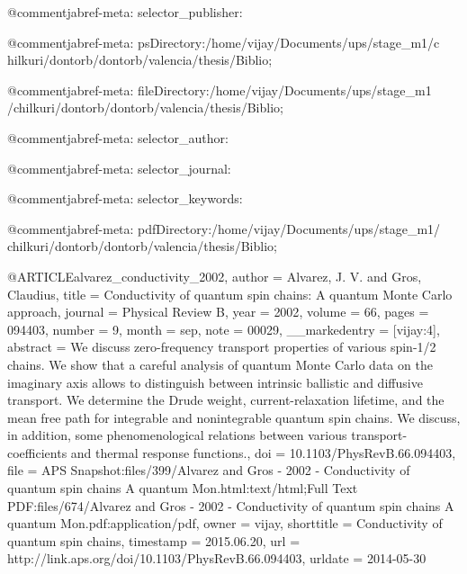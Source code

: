 @comment{jabref-meta: selector_publisher:}

@comment{jabref-meta: psDirectory:/home/vijay/Documents/ups/stage_m1/c
hilkuri/dontorb/dontorb/valencia/thesis/Biblio;}

@comment{jabref-meta: fileDirectory:/home/vijay/Documents/ups/stage_m1
/chilkuri/dontorb/dontorb/valencia/thesis/Biblio;}

@comment{jabref-meta: selector_author:}

@comment{jabref-meta: selector_journal:}

@comment{jabref-meta: selector_keywords:}

@comment{jabref-meta: pdfDirectory:/home/vijay/Documents/ups/stage_m1/
chilkuri/dontorb/dontorb/valencia/thesis/Biblio;}



@ARTICLE{alvarez_conductivity_2002,
  author = {Alvarez, J. V. and Gros, Claudius},
  title = {Conductivity of quantum spin chains: {A} quantum {Monte} {Carlo}
	approach},
  journal = {Physical Review B},
  year = {2002},
  volume = {66},
  pages = {094403},
  number = {9},
  month = sep,
  note = {00029},
  __markedentry = {[vijay:4]},
  abstract = {We discuss zero-frequency transport properties of various spin-1/2
	chains. We show that a careful analysis of quantum Monte Carlo data
	on the imaginary axis allows to distinguish between intrinsic ballistic
	and diffusive transport. We determine the Drude weight, current-relaxation
	lifetime, and the mean free path for integrable and nonintegrable
	quantum spin chains. We discuss, in addition, some phenomenological
	relations between various transport-coefficients and thermal response
	functions.},
  doi = {10.1103/PhysRevB.66.094403},
  file = {APS Snapshot:files/399/Alvarez and Gros - 2002 - Conductivity of quantum spin chains A quantum Mon.html:text/html;Full Text PDF:files/674/Alvarez and Gros - 2002 - Conductivity of quantum spin chains A quantum Mon.pdf:application/pdf},
  owner = {vijay},
  shorttitle = {Conductivity of quantum spin chains},
  timestamp = {2015.06.20},
  url = {http://link.aps.org/doi/10.1103/PhysRevB.66.094403},
  urldate = {2014-05-30}
}

